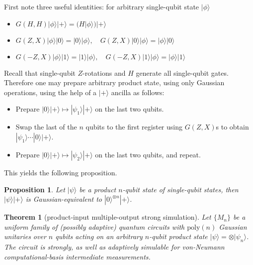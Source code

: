 \documentclass[
]{book}
\providecommand{\tightlist}{%
  \setlength{\itemsep}{0pt}\setlength{\parskip}{0pt}}
\newtheorem{theorem}{Theorem}[chapter]
\newtheorem{proposition}{Proposition}[chapter]
\theoremstyle{definition}
\theoremstyle{definition}
\theoremstyle{definition}
\theoremstyle{definition}
\theoremstyle{remark}
\begin{document}
First note three useful identities: for arbitrary single-qubit state \(|\phi\rangle\)

\begin{itemize}
\tightlist
\item
  \(G(H, H)|\phi\rangle|+\rangle= (H|\phi\rangle)|+\rangle\)
\item
  \(G(Z, X)|\phi\rangle|0\rangle= |0\rangle|\phi\rangle, \quad
  G(Z, X)|0\rangle|\phi\rangle= |\phi\rangle|0\rangle\)
\item
  \(G(-Z, X)|\phi\rangle|1\rangle= |1\rangle|\phi\rangle, \quad
  G(-Z, X)|1\rangle|\phi\rangle= |\phi\rangle|1\rangle\)
\end{itemize}

Recall that single-qubit \(Z\)-rotations and \(H\) generate all single-qubit gates.
Therefore one may prepare arbitrary product state, using only Gaussian operations,
using the help of a \(|+\rangle\) ancilla as follows:

\begin{itemize}
\tightlist
\item
  Prepare \(|0\rangle|+\rangle\mapsto |\psi_1\rangle|+\rangle\) on the last two qubits.
\item
  Swap the last of the \(n\) qubits to the first register using \(G(Z, X)\)s
  to obtain \(|\psi_1\rangle\cdots |0\rangle|+\rangle\).
\item
  Prepare \(|0\rangle|+\rangle\mapsto |\psi_2\rangle|+\rangle\) on the last two qubits, and repeat.
\end{itemize}

This yields the following proposition.

\begin{proposition}
\protect\hypertarget{prp:freeEquivProductState}{}\label{prp:freeEquivProductState}Let \(|\psi\rangle\) be a product \(n\)-qubit state of single-qubit states, then
\(|\psi\rangle|+\rangle\) is Gaussian-equivalent to \(|0\rangle^{\otimes n}|+\rangle\).
\end{proposition}

\begin{theorem}[product-input multiple-output strong simulation]
\protect\hypertarget{thm:pimoSimulation}{}\label{thm:pimoSimulation}Let \(\{M_n\}\) be a uniform family of (possibly adaptive) quantum
circuits with \(\mathrm{poly}(n)\) Gaussian unitaries over \(n\) qubits acting
on an arbitrary \(n\)-qubit product state \(|\psi\rangle= \otimes |\psi_n\rangle\).
The circuit is strongly, as well as adaptively simulable
for von-Neumann computational-basis intermediate measurements.
\end{theorem}
\end{document}
